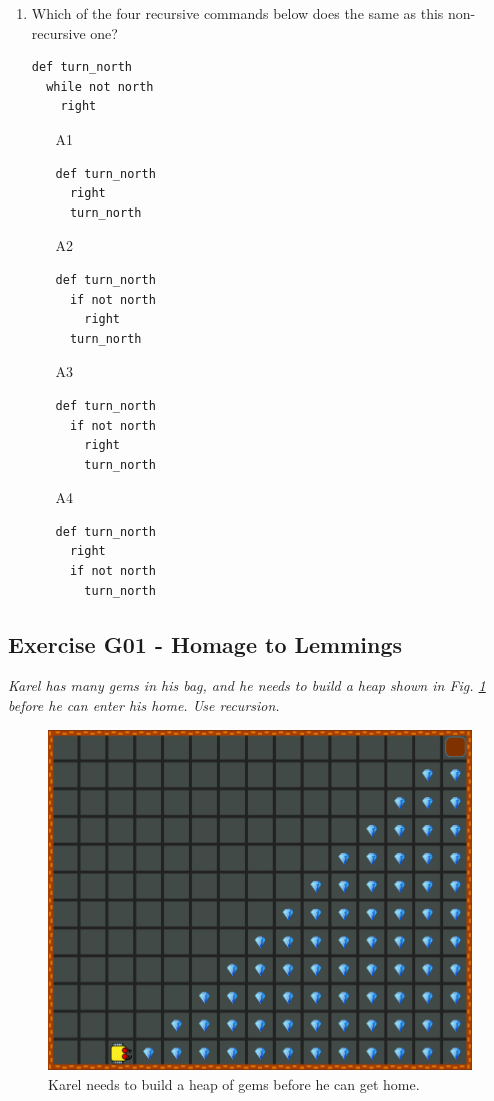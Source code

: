 \documentclass[article,A4,12pt]{llncs}
\begin{document}
{{{{\begin{enumerate}
\begin{enumerate}
\end{enumerate}
\item Which of the four recursive commands below does the same as this non-recursive one?
\begin{verbatim}
def turn_north
  while not north
    right
\end{verbatim}
\begin{enumerate}
\item[A1]
\begin{verbatim}
def turn_north
  right
  turn_north
\end{verbatim}
\item[A2] 
\begin{verbatim}
def turn_north
  if not north
    right
  turn_north
\end{verbatim}
\item[A3] 
\begin{verbatim}
def turn_north
  if not north
    right
    turn_north
\end{verbatim}
\item[A4] 
\begin{verbatim}
def turn_north
  right
  if not north 
    turn_north
\end{verbatim}
\end{enumerate}

\end{enumerate}

\subsection{Exercise G01 - Homage to Lemmings}

{\em  Karel has many gems in his bag, and he needs to build a heap shown in Fig. \ref{fig:g01} before he can 
enter his home. Use recursion. }

\newpage
\begin{figure}[!ht]
\begin{center}
\includegraphics[height=0.4\textwidth]{img/g01.png}
\end{center}
\vspace{-4mm}
\caption{Karel needs to build a heap of gems before he can get home.}
\label{fig:g01}
\end{figure}
\noindent

}}}}
\end{document}
